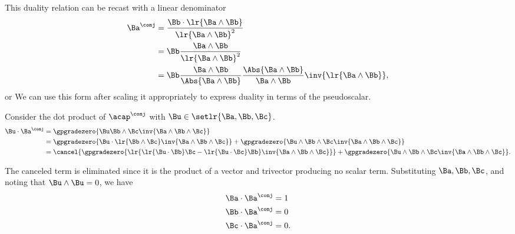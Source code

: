 This duality relation can be recast with a linear denominator
\begin{equation}\label{eqn:stokesTheoremGeometricAlgebra:4850}
\begin{aligned}
\Ba^\conj
&= \frac{\Bb \cdot \lr{ \Ba \wedge \Bb }}{\lr{\Ba \wedge \Bb}^2} \\
&= \Bb \frac{\Ba \wedge \Bb }{\lr{\Ba \wedge \Bb}^2} \\
&= \Bb \frac{\Ba \wedge \Bb }{\Abs{\Ba \wedge \Bb }}
      \frac{\Abs{\Ba \wedge \Bb}}{\Ba \wedge \Bb }
\inv{\lr{\Ba \wedge \Bb}},
\end{aligned}
\end{equation}
or
We can use this form after scaling it appropriately to express duality in terms of the pseudoscalar.

Consider the dot product of \(\acap^\conj\) with \(\Bu \in \setlr{\Ba, \Bb, \Bc}\).
\begin{equation}\label{eqn:stokesTheoremGeometricAlgebra:4970}
\begin{aligned}
\Bu \cdot \Ba^\conj
&=
\gpgradezero{ \Bu \Bb \wedge \Bc \inv{\Ba \wedge \Bb \wedge \Bc} } \\
&=
\gpgradezero{ \Bu \cdot \lr{ \Bb \wedge \Bc} \inv{\Ba \wedge \Bb \wedge \Bc} }
+
\gpgradezero{ \Bu \wedge \Bb \wedge \Bc \inv{\Ba \wedge \Bb \wedge \Bc} } \\
&=
\cancel{\gpgradezero{
\lr{
\lr{ \Bu \cdot \Bb} \Bc
-\lr{\Bu \cdot \Bc} \Bb
}
\inv{\Ba \wedge \Bb \wedge \Bc} }
}
+
\gpgradezero{ \Bu \wedge \Bb \wedge \Bc \inv{\Ba \wedge \Bb \wedge \Bc} }.
\end{aligned}
\end{equation}

The canceled term is eliminated since it is the product of a vector and trivector producing no scalar term.  Substituting \(\Ba, \Bb, \Bc\), and noting that \(\Bu \wedge \Bu = 0\), we have
%
\begin{equation}\label{eqn:stokesTheoremGeometricAlgebra:4990}
\begin{aligned}
\Ba \cdot \Ba^\conj &= 1 \\
\Bb \cdot \Ba^\conj &= 0 \\
\Bc \cdot \Ba^\conj &= 0.
\end{aligned}
\end{equation}
%

